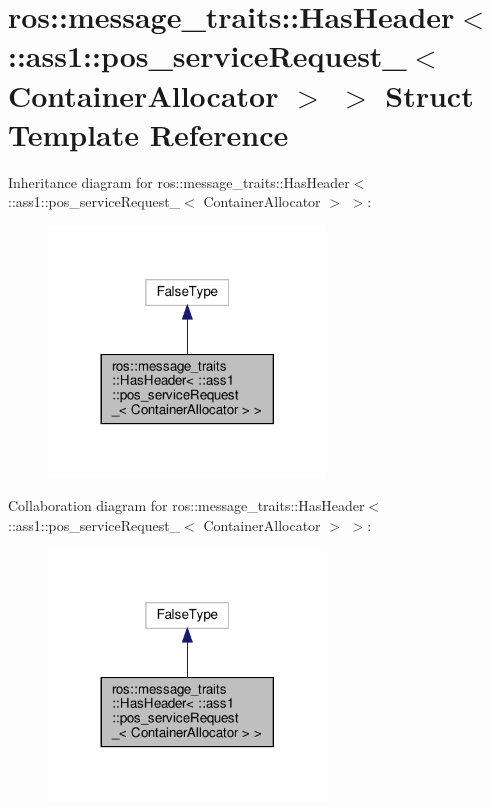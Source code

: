 \hypertarget{structros_1_1message__traits_1_1HasHeader_3_01_1_1ass1_1_1pos__serviceRequest___3_01ContainerAllocator_01_4_01_4}{}\section{ros\+:\+:message\+\_\+traits\+:\+:Has\+Header$<$ \+:\+:ass1\+:\+:pos\+\_\+service\+Request\+\_\+$<$ Container\+Allocator $>$ $>$ Struct Template Reference}
\label{structros_1_1message__traits_1_1HasHeader_3_01_1_1ass1_1_1pos__serviceRequest___3_01ContainerAllocator_01_4_01_4}


Inheritance diagram for ros\+:\+:message\+\_\+traits\+:\+:Has\+Header$<$ \+:\+:ass1\+:\+:pos\+\_\+service\+Request\+\_\+$<$ Container\+Allocator $>$ $>$\+:
\nopagebreak
\begin{figure}[H]
\begin{center}
\leavevmode
\includegraphics[width=209pt]{structros_1_1message__traits_1_1HasHeader_3_01_1_1ass1_1_1pos__serviceRequest___3_01ContainerAll58a61d97597cd4e7e0ed3158323d048d}
\end{center}
\end{figure}


Collaboration diagram for ros\+:\+:message\+\_\+traits\+:\+:Has\+Header$<$ \+:\+:ass1\+:\+:pos\+\_\+service\+Request\+\_\+$<$ Container\+Allocator $>$ $>$\+:
\nopagebreak
\begin{figure}[H]
\begin{center}
\leavevmode
\includegraphics[width=209pt]{structros_1_1message__traits_1_1HasHeader_3_01_1_1ass1_1_1pos__serviceRequest___3_01ContainerAllocator_01_4_01_4__coll__graph}
\end{center}
\end{figure}


